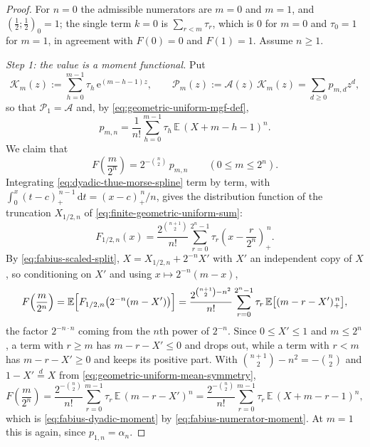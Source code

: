 \documentclass[11pt,oneside,openany]{book}
\theoremstyle{definition}
\theoremstyle{remark}
\newcommand{\e}{\mathrm e}
\newcommand{\dd}{\,\mathrm d}
\newcommand{\defeq}{\mathrel{:=}}
\begin{document}
\begin{proof}
For $n=0$ the admissible numerators are $m=0$ and $m=1$, and
$\left(\tfrac12;\tfrac12\right)_0=1$; the single term $k=0$ is $\sum_{r<m}\tau_r$,
which is $0$ for $m=0$ and $\tau_0=1$ for $m=1$, in agreement with $F(0)=0$ and
$F(1)=1$.  Assume $n\ge1$.

\emph{Step 1: the value is a moment functional.}  Put
\begin{equation}\label{eq:fabius-numerator-series}
 \mathcal K_m(z)\defeq\sum_{h=0}^{m-1}\tau_h\,\e^{(m-h-1)z},
 \qquad
 \mathcal P_m(z)\defeq\mathcal A(z)\,\mathcal K_m(z)=\sum_{d\ge0}p_{m,d}z^d,
\end{equation}
so that $\mathcal P_1=\mathcal A$ and, by \eqref{eq:geometric-uniform-mgf-def},
\begin{equation}\label{eq:fabius-numerator-moment}
 p_{m,n}=\frac1{n!}\sum_{h=0}^{m-1}\tau_h\,\mathbb E\,(X+m-h-1)^n .
\end{equation}
We claim that
\begin{equation}\label{eq:fabius-dyadic-moment}
 F\!\left(\frac m{2^n}\right)=2^{-\binom n2}\,p_{m,n}
 \qquad(0\le m\le2^n).
\end{equation}
Integrating \eqref{eq:dyadic-thue-morse-spline} term by term, with
$\int_0^x(t-c)_+^{\,n-1}\dd t=(x-c)_+^{\,n}/n$, gives the distribution function of the
truncation $X_{1/2,n}$ of \eqref{eq:finite-geometric-uniform-sum}:
\[
 F_{1/2,n}(x)
 =\frac{2^{\binom{n+1}{2}}}{n!}\sum_{r=0}^{2^n-1}\tau_r
   \left(x-\frac r{2^n}\right)_+^{\,n}.
\]
By \eqref{eq:fabius-scaled-split}, $X=X_{1/2,n}+2^{-n}X'$ with $X'$ an independent
copy of $X$, so conditioning on $X'$ and using $x\mapsto2^{-n}(m-x)$,
\[
 F\!\left(\frac m{2^n}\right)
 =\mathbb E\Bigl[F_{1/2,n}\bigl(2^{-n}(m-X')\bigr)\Bigr]
 =\frac{2^{\binom{n+1}{2}-n^2}}{n!}
  \sum_{r=0}^{2^n-1}\tau_r\,\mathbb E\bigl[(m-r-X')_+^{\,n}\bigr],
\]
the factor $2^{-n\cdot n}$ coming from the $n$th power of $2^{-n}$.  Since
$0\le X'\le1$ and $m\le2^n$, a term with $r\ge m$ has $m-r-X'\le0$ and drops out,
while a term with $r<m$ has $m-r-X'\ge0$ and keeps its positive part.  With
$\binom{n+1}{2}-n^2=-\binom n2$ and $1-X'\overset d=X$ from
\eqref{eq:geometric-uniform-mean-symmetry},
\[
 F\!\left(\frac m{2^n}\right)
 =\frac{2^{-\binom n2}}{n!}\sum_{r=0}^{m-1}\tau_r\,\mathbb E\,(m-r-X')^n
 =\frac{2^{-\binom n2}}{n!}\sum_{r=0}^{m-1}\tau_r\,\mathbb E\,(X+m-r-1)^n,
\]
which is \eqref{eq:fabius-dyadic-moment} by \eqref{eq:fabius-numerator-moment}.  At
$m=1$ this is  again, since $p_{1,n}=\alpha_n$.


\end{proof}
\end{document}
